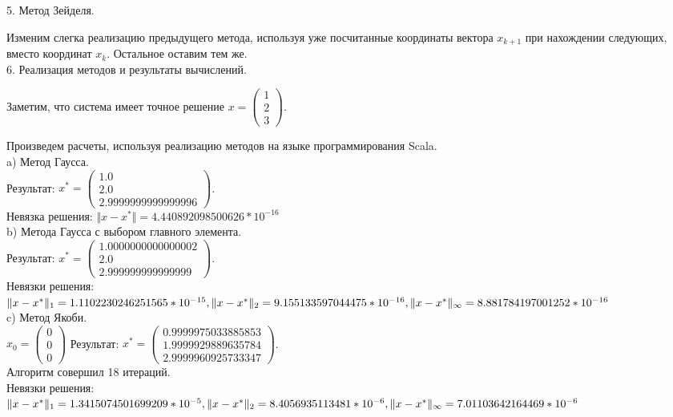 \documentclass{article}
\begin{document}
	5. Метод Зейделя.
	
	Изменим слегка реализацию предыдущего метода, исполь\-зуя уже по\-счи\-тан\-ные координаты вектора $x_{k+1}$ при нахождении следующих, вместо координат $x_{k}$. Остальное оставим тем же.\\
	
	6. Реализация методов и результаты вычислений.
	
	Заметим, что система имеет точное решение $x = \left( \begin{array}{c} 1\\ 2\\ 3 \end{array} \right)$.
	
	Произведем расчеты, используя реализацию методов на языке про\-грам\-ми\-ро\-вания Scala.\\
	
	a) Метод Гаусса.\\ Результат: $x^* = \left( \begin{array}{c} 1.0\\ 2.0\\ 2.9999999999999996 \end{array} \right)$.\\
	 Невязка решения: $\Vert x - x^* \Vert = 4.440892098500626*10^{-16}$\\
	
	b) Метода Гаусса с выбором главного элемента.\\ Результат: $x^* = \left( \begin{array}{c} 1.0000000000000002\\ 2.0\\ 2.999999999999999 \end{array} \right)$.\\
	 Невязки решения:\\ $\Vert x - x^* \Vert_1 = 1.1102230246251565*10^{-15},\\ \Vert x - x^* \Vert_2 = 9.155133597044475*10^{-16},\\ \Vert x - x^* \Vert_\infty = 8.881784197001252*10^{-16}$	\\
	
	c) Метод Якоби. \\ $x_0 = \left( \begin{array}{c} 0\\ 0\\ 0 \end{array} \right)$ Результат: $x^* = \left( \begin{array}{c} 0.9999975033885853\\ 1.9999929889635784\\ 2.9999960925733347 \end{array} \right)$.\\
	Алгоритм совершил 18 итераций.\\
	Невязки решения:\\ $\Vert x - x^* \Vert_1 = 1.3415074501699209*10^{-5},\\ \Vert x - x^* \Vert_2 = 8.4056935113481*10^{-6},\\ \Vert x - x^* \Vert_\infty = 7.01103642164469*10^{-6}$	\\
\end{document}
